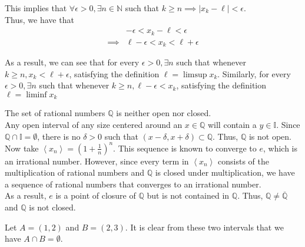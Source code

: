 \documentclass[12pt]{article}
\newenvironment{problem}[2][Problem]{\begin{trivlist}
\item[\hskip \labelsep {\bfseries #1}\hskip \labelsep {\bfseries #2.}]}{\end{trivlist}}
\begin{document}
\begin{enumerate}[i)]
	This implies that $\forall \epsilon > 0, \exists n \in \mathbb{N}$ such that $k \geq n \implies |x_k - \ell| < \epsilon$.\\
	
	Thus, we have that
	\begin{align*}
	&-\epsilon < x_k - \ell < \epsilon\\
	\implies &\ell - \epsilon < x_k < \ell + \epsilon
	\end{align*}
	
	As a result, we can see that for every $\epsilon > 0, \exists n$ such that whenever $k \geq n, x_k < \ell + \epsilon$, satisfying the definition $\ell = \limsup{x_k}$. Similarly, for every $\epsilon > 0, \exists n$ such that whenever $k \geq n, \ell - \epsilon < x_k$, satisfying the definition $\ell = \liminf{x_k}$

\end{enumerate}

\begin{problem}{3}
\end{problem}

The set of rational numbers $\mathbb{Q}$ is neither open nor closed.\\

Any open interval of any size centered around an $x \in \mathbb{Q}$ will contain a $y \in \mathbb{I}$. Since $\mathbb{Q} \cap \mathbb{I} = \emptyset$, there is no $\delta > 0$ such that $(x - \delta, x + \delta) \subset \mathbb{Q}$. Thus, $\mathbb{Q}$ is not open.\\

Now take $\left<x_n\right> = (1 + \frac{1}{n})^n$. This sequence is known to converge to $e$, which is an irrational number. However, since every term in $\left<x_n\right>$ consists of the multiplication of rational numbers and $\mathbb{Q}$ is closed under multiplication, we have a sequence of rational numbers that converges to an irrational number.\\

As a result, $e$ is a point of closure of $\mathbb{Q}$ but is not contained in $\mathbb{Q}$. Thus, $\mathbb{Q} \neq \overline{\mathbb{Q}}$ and $\mathbb{Q}$ is not closed.

\begin{problem}{4}
\end{problem}

Let $A = (1, 2)$ and $B = (2, 3)$. It is clear from these two intervals that we have $A \cap B = \emptyset$.\\
\end{document}
